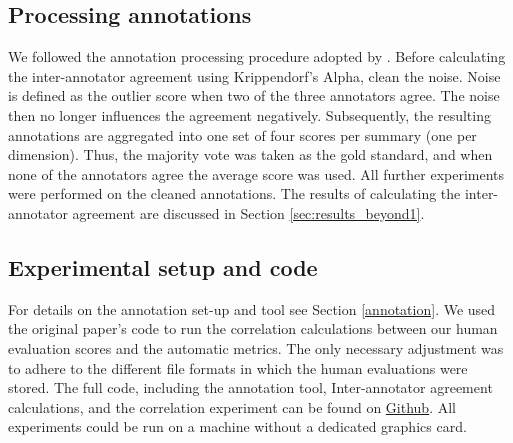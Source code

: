 \subsection{Processing annotations} 
\label{meth:ann_proc}
 We followed the annotation processing procedure adopted by \cite{gao2022dialsummeval}. Before calculating the inter-annotator agreement using Krippendorf's Alpha, \citet{gao2022dialsummeval} clean the noise. Noise is defined as the outlier score when two of the three annotators agree. The noise then no longer influences the agreement negatively. Subsequently, the resulting annotations are aggregated into one set of four scores per summary (one per dimension). Thus, the majority vote was taken as the gold standard, and when none of the annotators agree the average score was used. All further experiments were performed on the cleaned annotations. The results of calculating the inter-annotator agreement are discussed in Section \ref{sec:results_beyond1}.


\subsection{Experimental setup and code}
For details on the annotation set-up and tool see Section \ref{annotation}. We used the original paper's code to run the correlation calculations between our human evaluation scores and the automatic metrics. 
The only necessary adjustment was to adhere to the different file formats in which the human evaluations were stored.
The full code, including the annotation tool, Inter-annotator agreement calculations, and the correlation experiment can be found on \href{https://anonymous.4open.science/r/Reproducing_DialSummEval-7371/}{Github}\footnotemark[1]. All experiments could be run on a machine without a dedicated graphics card.





